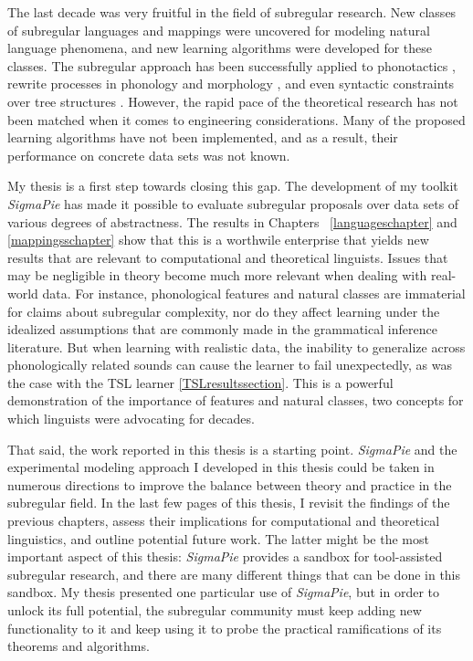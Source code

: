 The last decade was very fruitful in the field of subregular research.
New classes of subregular languages and mappings were uncovered for modeling natural language phenomena, and new learning algorithms were developed for these classes.
The subregular approach has been successfully applied to phonotactics \citep{Heinz10ldp}, rewrite processes in phonology and morphology \citep{Chandlee2014}, and even syntactic constraints over tree structures \citep{Graf18CLS}.
However, the rapid pace of the theoretical research has not been matched when it comes to engineering considerations.
Many of the proposed learning algorithms have not been implemented, and as a result, their performance on concrete data sets was not known.

My thesis is a first step towards closing this gap.
The development of my toolkit \emph{SigmaPie} has made it possible to evaluate subregular proposals over data sets of various degrees of abstractness.
The results in Chapters~ \ref{languageschapter} and \ref{mappingsschapter} show that this is a worthwile enterprise that yields new results that are relevant to computational and theoretical linguists.
Issues that may be negligible in theory become much more relevant when dealing with real-world data.
For instance, phonological features and natural classes are immaterial for claims about subregular complexity, nor do they affect learning under the idealized assumptions that are commonly made in the grammatical inference literature.
But when learning with realistic data, the inability to generalize across phonologically related sounds can cause the learner to fail unexpectedly, as was the case with the TSL learner \ref{TSLresultssection}.
This is a powerful demonstration of the importance of features and natural classes, two concepts for which linguists were advocating for decades.

That said, the work reported in this thesis is a starting point.
\emph{SigmaPie} and the experimental modeling approach I developed in this thesis could be taken in numerous directions to improve the balance between theory and practice in the subregular field.
In the last few pages of this thesis, I revisit the findings of the previous chapters, assess their implications for computational and theoretical linguistics, and outline potential future work. 
The latter might be the most important aspect of this thesis:
\emph{SigmaPie} provides a sandbox for tool-assisted subregular research, and there are many different things that can be done in this sandbox.
My thesis presented one particular use of \emph{SigmaPie}, but in order to unlock its full potential, the subregular community must keep adding new functionality to it and keep using it to probe the practical ramifications of its theorems and algorithms.



